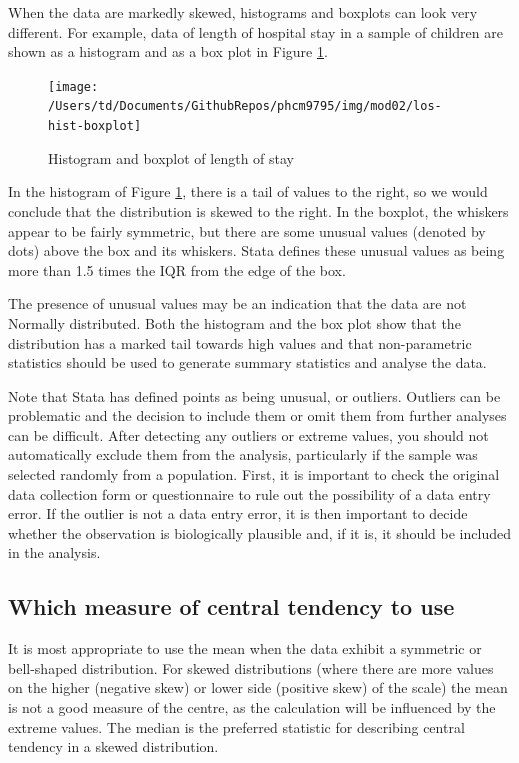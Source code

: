 \documentclass[
]{memoir}
\begin{document}
When the data are markedly skewed, histograms and boxplots can look very different. For example, data of length of hospital stay in a sample of children are shown as a histogram and as a box plot in Figure \ref{fig:fig-2-7}.

\begin{figure}
\texttt{[image: /Users/td/Documents/GithubRepos/phcm9795/img/mod02/los-hist-boxplot]} \caption{Histogram and boxplot of length of stay}\label{fig:fig-2-7}
\end{figure}

In the histogram of Figure \ref{fig:fig-2-7}, there is a tail of values to the right, so we would conclude that the distribution is skewed to the right. In the boxplot, the whiskers appear to be fairly symmetric, but there are some unusual values (denoted by dots) above the box and its whiskers. Stata defines these unusual values as being more than 1.5 times the IQR from the edge of the box.

The presence of unusual values may be an indication that the data are not Normally distributed. Both the histogram and the box plot show that the distribution has a marked tail towards high values and that non-parametric statistics should be used to generate summary statistics and analyse the data.

Note that Stata has defined points as being unusual, or outliers. Outliers can be problematic and the decision to include them or omit them from further analyses can be difficult. After detecting any outliers or extreme values, you should not automatically exclude them from the analysis, particularly if the sample was selected randomly from a population. First, it is important to check the original data collection form or questionnaire to rule out the possibility of a data entry error. If the outlier is not a data entry error, it is then important to decide whether the observation is biologically plausible and, if it is, it should be included in the analysis.

\hypertarget{which-measure-of-central-tendency-to-use}{%
\subsection{Which measure of central tendency to use}\label{which-measure-of-central-tendency-to-use}}

It is most appropriate to use the mean when the data exhibit a symmetric or bell-shaped distribution. For skewed distributions (where there are more values on the higher (negative skew) or lower side (positive skew) of the scale) the mean is not a good measure of the centre, as the calculation will be influenced by the extreme values. The median is the preferred statistic for describing central tendency in a skewed distribution.
\end{document}
